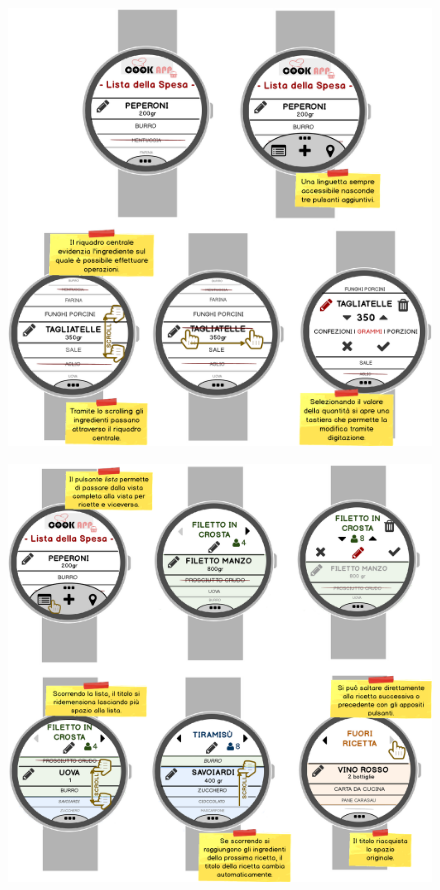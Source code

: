 \begin{figure}[H]
	\centering
	\includegraphics[width=0.95\linewidth]{img/mockup/zmart.png}
\end{figure}
\begin{figure}[H]
	\centering
	\includegraphics[width=0.95\linewidth]{img/mockup/zmart-vista-ricetta.png}
\end{figure}
